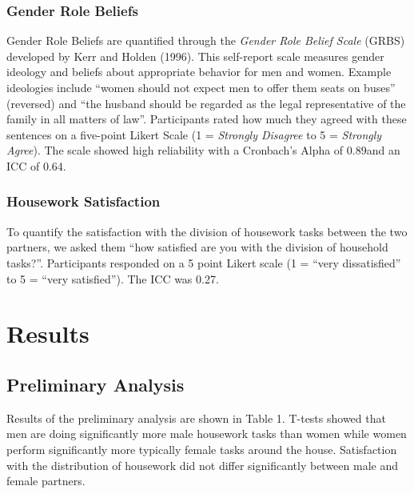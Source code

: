 \documentclass[
  man,floatsintext]{apa6}
\begin{document}
\hypertarget{gender-role-beliefs}{%
\subsubsection{Gender Role Beliefs}\label{gender-role-beliefs}}

Gender Role Beliefs are quantified through the \emph{Gender Role Belief Scale} (GRBS) developed by Kerr and Holden (1996). This self-report scale measures gender ideology and beliefs about appropriate behavior for men and women. Example ideologies include ``women should not expect men to offer them seats on buses'' (reversed) and ``the husband should be regarded as the legal representative of the family in all matters of law''. Participants rated how much they agreed with these sentences on a five-point Likert Scale (1 = \emph{Strongly Disagree} to 5 = \emph{Strongly Agree}). The scale showed high reliability with a Cronbach's Alpha of 0.89and an ICC of 0.64.

\hypertarget{housework-satisfaction}{%
\subsubsection{Housework Satisfaction}\label{housework-satisfaction}}

To quantify the satisfaction with the division of housework tasks between the two partners, we asked them ``how satisfied are you with the division of household tasks?''. Participants responded on a 5 point Likert scale (1 = ``very dissatisfied'' to 5 = ``very satisfied''). The ICC was 0.27.

\hypertarget{results}{%
\section{Results}\label{results}}

\hypertarget{preliminary-analysis}{%
\subsection{Preliminary Analysis}\label{preliminary-analysis}}

Results of the preliminary analysis are shown in Table 1. T-tests showed that men are doing significantly more male housework tasks than women while women perform significantly more typically female tasks around the house. Satisfaction with the distribution of housework did not differ significantly between male and female partners.
\end{document}
